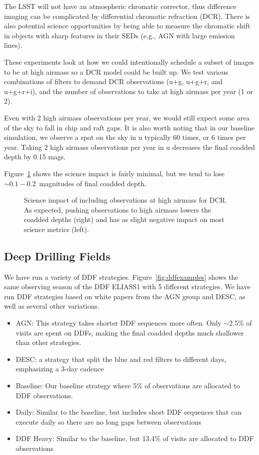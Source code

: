 The LSST will not have an atmospheric chromatic corrector, thus difference imaging can be complicated by differential chromatic refraction (DCR). There is also potential science opportunities by being able to measure the chromatic shift in objects with sharp features in their SEDs (e.g., AGN with large emission lines).

These experiments look at how we could intentionally schedule a subset of images to be at high airmass so a DCR model could be built up. We test various combinations of filters to demand DCR observations (u+g, u+g+r, and u+g+r+i), and the number of observations to take at high airmass per year (1 or 2). 

Even with 2 high airmass observations per year, we would still expect some area of the sky to fall in chip and raft gaps.  It is also worth noting that in our baseline simulation, we observe a spot on the sky in u typically 60 times, or 6 times per year. Taking 2 high airmass observations per year in u decreases the final coadded depth by 0.15 mags.

Figure~\ref{fig:dcr_radar} shows the science impact is fairly minimal, but we tend to lose $\sim0.1-0.2$\ magnitudes of final coadded depth.

\begin{figure}
\caption{Science impact of including observations at high airmass for DCR. As expected, pushing observations to high airmass lowers the coadded depths (right) and has as slight negative impact on most science metrics (left).}\label{fig:dcr_radar}
\end{figure}
   
\subsection{Deep Drilling Fields}

We have run a variety of DDF strategies. Figure~\ref{fig:ddfexamples} shows the same observing season of the DDF ELIASS1 with 5 different strategies. We have run DDF strategies based on white papers from the AGN group and DESC, as well as several other variations. 

\begin{itemize}
    \item{AGN: This strategy takes shorter DDF sequences more often. Only $\sim$2.5\% of visits are spent on DDFs, making the final coadded depths much shallower than other strategies.}
    \item{DESC: a strategy that split the blue and red filters to different days, emphasizing a 3-day cadence}
    \item{Baseline:  Our baseline strategy where 5\% of observations are allocated to DDF observations.}
    \item{Daily: Similar to the baseline, but includes short DDF sequences that can execute daily so there are no long gaps between observations}
    \item{DDF Heavy:  Similar to the baseline, but 13.4\% of visits are allocated to DDF observations}
\end{itemize}


